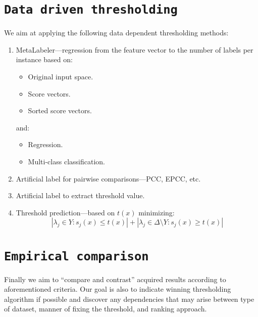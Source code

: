\documentclass[12pt,a4paper,twocolumn]{article}
\newcommand{\ts}{\textsuperscript}
\begin{document}
\section*{\texttt{Data driven thresholding}}
We aim at applying the following data dependent thresholding methods:
\begin{enumerate}
\item MetaLabeler---regression from the feature vector to the number of labels per instance based on:
	\begin{itemize} %
	\item Original input space.
	\item Score vectors.
	\item Sorted score vectors.
	\end{itemize}
	and:
	\begin{itemize} %
	\item Regression.
	\item Multi-class classification.
	\end{itemize}

\item Artificial label for pairwise comparisons---PCC, EPCC, etc.
\item Artificial label to extract threshold value.
\item Threshold prediction---based on $t(x)$ minimizing:
	$$
	| \lambda_j \in Y : s_j(x) \leq t(x) | + | \lambda_j \in \Delta \text{\textbackslash{}} Y : s_j(x) \geq t(x) |
	$$
\end{enumerate}

\section*{\texttt{Empirical comparison}}
Finally we aim to ``compare and contrast'' acquired results according to aforementioned criteria. Our goal is also to indicate winning thresholding algorithm if possible and discover any dependencies that may arise between type of dataset, manner of fixing the threshold, and ranking approach.

\end{document}
